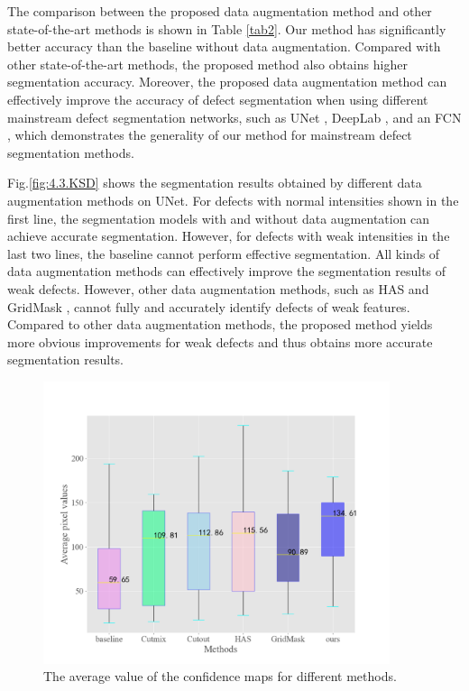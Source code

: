 \documentclass[sn-mathphys]{sn-jnl}%
\theoremstyle{thmstyleone}%
\theoremstyle{thmstyletwo}%
\theoremstyle{thmstylethree}%
\begin{document}
The comparison between the proposed data augmentation method and other state-of-the-art methods is shown in Table \ref{tab2}. Our method has significantly better accuracy than the baseline without data augmentation. 
Compared with other state-of-the-art methods, the proposed method also obtains higher segmentation accuracy.
Moreover, the proposed data augmentation method can effectively improve the accuracy of defect segmentation when using different mainstream defect segmentation networks, such as UNet \cite{ronneberger2015u}, DeepLab \cite{chen2018deeplab:}, and an FCN \cite{long2015fully}, which demonstrates the generality of our method for mainstream defect segmentation methods.

Fig.\ref{fig:4.3.KSD} shows the segmentation results obtained by different data augmentation methods on UNet. For defects with normal intensities shown in the first line, the segmentation models with and without data augmentation can achieve accurate segmentation. However, for defects with weak intensities in the last two lines, the baseline cannot perform effective segmentation. All kinds of data augmentation methods can effectively improve the segmentation results of weak defects. However, other data augmentation methods, such as HAS\cite{singh2017hide} and GridMask \cite{chen2020gridmask}, cannot fully and accurately identify defects of weak features. Compared to other data augmentation methods, the proposed method yields more obvious improvements for weak defects and thus obtains more accurate segmentation results.

\begin{figure}
\centering
\includegraphics[width=4in]{fig10.png}
\caption{The average value of the confidence maps for different methods.}\label{fig:3.avemethod}
\end{figure}
\end{document}
